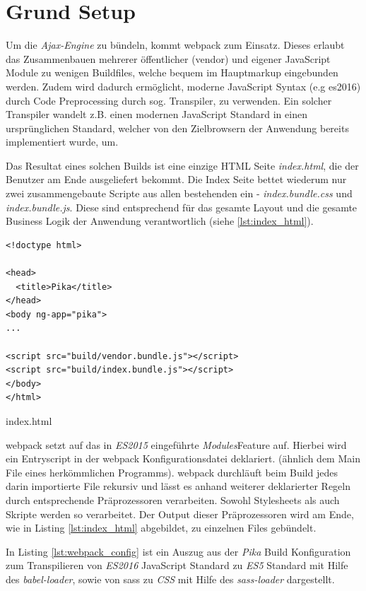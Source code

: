 \section{Grund Setup}
\label{sec:grund_setup}

Um die \textit{Ajax-Engine} zu bündeln, kommt \gls{webpack} zum Einsatz. Dieses erlaubt das Zusammenbauen mehrerer öffentlicher (vendor) und eigener JavaScript Module zu wenigen Buildfiles, welche bequem im Hauptmarkup eingebunden werden. Zudem wird dadurch ermöglicht, moderne JavaScript Syntax (e.g \gls{es2016}) durch Code Preprocessing durch sog. Transpiler, zu verwenden. Ein solcher Transpiler wandelt z.B. einen modernen JavaScript Standard in einen ursprünglichen Standard, welcher von den Zielbrowsern der Anwendung bereits implementiert wurde, um.

Das Resultat eines solchen Builds ist eine einzige HTML Seite \textit{index.html}, die der Benutzer am Ende ausgeliefert bekommt. Die Index Seite bettet wiederum nur zwei zusammengebaute Scripte aus allen bestehenden ein - \textit{index.bundle.css} und \textit{index.bundle.js}. Diese sind entsprechend für das gesamte Layout und die gesamte Business Logik der Anwendung verantwortlich (siehe \ref{lst:index_html}).

\begin{listing}[H]
\begin{verbatim}
<!doctype html>

<head>
  <title>Pika</title>
</head>
<body ng-app="pika">
...

<script src="build/vendor.bundle.js"></script>
<script src="build/index.bundle.js"></script>
</body>
</html>

\end{verbatim}
\caption{index.html}
\label{lst:index_html}
\end{listing}

\gls{webpack} setzt auf das in \textit{ES2015} eingeführte \textit{Modules}Feature auf. Hierbei wird ein Entryscript in der \gls{webpack} Konfigurationsdatei deklariert. (ähnlich dem Main File eines herkömmlichen Programms). \gls{webpack} durchläuft beim Build jedes darin importierte File rekursiv und lässt es anhand weiterer deklarierter Regeln durch entsprechende Präprozessoren verarbeiten. Sowohl Stylesheets als auch Skripte werden so verarbeitet. Der Output dieser Präprozessoren wird am Ende, wie in Listing \ref{lst:index_html} abgebildet, zu einzelnen Files gebündelt.

In Listing \ref{lst:webpack_config} ist ein Auszug aus der \textit{Pika} Build Konfiguration zum Transpilieren von \textit{ES2016} JavaScript Standard zu \textit{ES5} Standard mit Hilfe des \textit{babel-loader}, sowie von \gls{sass} zu \textit{CSS} mit Hilfe des \textit{sass-loader} dargestellt.

